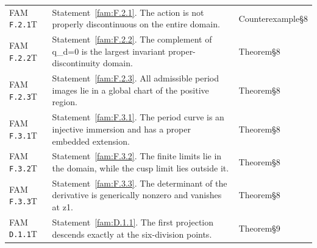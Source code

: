 \begin{longtable}{@{}L{.18\linewidth}L{.48\linewidth}L{.29\linewidth}@{}}
FAM \nolinkurl{F.2.1}\newline T & Statement~\ref{fam:F.2.1}. The action is not properly discontinuous on the entire domain.\newline {} & Counterexample\newline §8\\
FAM \nolinkurl{F.2.2}\newline T & Statement~\ref{fam:F.2.2}. The complement of q\_\allowbreak{}d=0 is the largest invariant proper-discontinuity domain.\newline {} & Theorem\newline §8\\
FAM \nolinkurl{F.2.3}\newline T & Statement~\ref{fam:F.2.3}. All admissible period images lie in a global chart of the positive region.\newline {} & Theorem\newline §8\\
FAM \nolinkurl{F.3.1}\newline T & Statement~\ref{fam:F.3.1}. The period curve is an injective immersion and has a proper embedded extension.\newline {} & Theorem\newline §8\\
FAM \nolinkurl{F.3.2}\newline T & Statement~\ref{fam:F.3.2}. The finite limits lie in the domain, while the cusp limit lies outside it.\newline {} & Theorem\newline §8\\
FAM \nolinkurl{F.3.3}\newline T & Statement~\ref{fam:F.3.3}. The determinant of the derivative is generically nonzero and vanishes at z1.\newline {} & Theorem\newline §8\\
FAM \nolinkurl{D.1.1}\newline T & Statement~\ref{fam:D.1.1}. The first projection descends exactly at the six-division points.\newline {} & Theorem\newline §9\\

\end{longtable}
